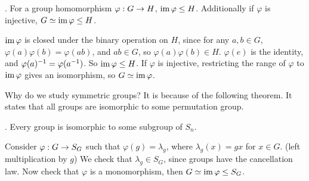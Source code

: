 \lemma. For a group homomorphism \(\varphi: G \rightarrow H\), \(\operatorname{im} \varphi \leq H\). Additionally if \(\varphi\) is injective, \(G \simeq \operatorname{im} \varphi \leq H\).

\pf \(\operatorname{im}\varphi\) is closed under the binary operation on \(H\), since for any \(a, b \in G\), \(\varphi(a)\varphi(b) = \varphi(ab)\), and \(ab \in G\), so \(\varphi(a)\varphi(b) \in H\). \(\varphi(e)\) is the identity, and \(\varphi(a)^{-1} = \varphi(a^{-1})\). So \(\operatorname{im}\varphi \leq H\). If \(\varphi\) is injective, restricting the range of \(\varphi\) to \(\operatorname{im} \varphi\) gives an isomorphism, so \(G \simeq \operatorname{im} \varphi\).

Why do we study symmetric groups? It is because of the following theorem. It states that all groups are isomorphic to some permutation group.

\thm.  Every group is isomorphic to some subgroup of \(S_n\).

\pf Consider \(\varphi : G \rightarrow S_G\) such that \(\varphi(g) = \lambda_g\), where \(\lambda_g(x) = gx\) for \(x \in G\). (left multiplication by \(g\)) We check that \(\lambda_g \in S_G\), since groups have the cancellation law. Now check that \(\varphi\) is a monomorphism, then \(G \simeq \operatorname{im} \varphi \leq S_G\).

\pagebreak
